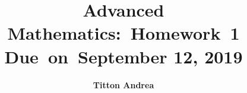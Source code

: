 \newcommand{\hmwkTitle}{Homework\ 1}
\newcommand{\hmwkDueDate}{September 12, 2019}
\newcommand{\hmwkClass}{Advanced Mathematics}
\newcommand{\hmwkAuthorName}{\textbf{Titton Andrea}}

%
%

\title{
    \vspace{2in}
    \textmd{\textbf{\hmwkClass:\ \hmwkTitle}}\\
    \normalsize\vspace{0.1in}\small{Due\ on\ \hmwkDueDate}\\
    \vspace{3in}
}

\author{\hmwkAuthorName}
\date{}

\renewcommand{\part}[1]{\textbf{\large Part \Alph{partCounter}}\stepcounter{partCounter}\\}

%
%

\newcommand{\alg}[1]{\textsc{\bfseries \footnotesize #1}}

\newcommand{\deriv}[1]{\frac{\mathrm{d}}{\mathrm{d}x} (#1)}

\newcommand{\pderiv}[2]{\frac{\partial}{\partial #1} (#2)}

\newcommand{\dx}{\mathrm{d}x}

\newcommand{\solution}{\textbf{\large Solution}}

\newcommand{\E}{\mathrm{E}}
\newcommand{\Var}{\mathrm{Var}}
\newcommand{\Cov}{\mathrm{Cov}}
\newcommand{\Bias}{\mathrm{Bias}}

\newcommand{\norm}[1]{\left\lVert#1\right\rVert}
\newcommand{\abs}[1]{\left\lvert#1\right\rvert}




\maketitle

\pagebreak

